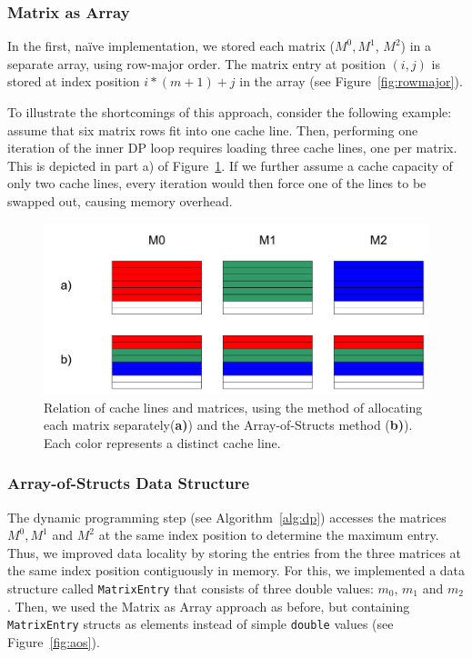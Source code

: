 \documentclass[runningheads,a4paper]{llncs}
\begin{document}
\subsubsection{Matrix as Array}
In the first, na\"ive implementation, we stored each matrix ($M^0, M^1$, $M^2$) in a separate array, using row-major order. 
The matrix entry at position $(i,j)$ is stored at index position $i*(m+1)+j$ in the array (see Figure~\ref{fig:rowmajor}).

To illustrate the shortcomings of this approach, consider the following example: assume that six matrix rows fit into one cache line. 
Then, performing one iteration of the inner DP loop requires loading three cache lines, one per matrix. 
This is depicted in part a) of Figure~\ref{fig:cachelines}.
If we further assume a cache capacity of only two cache lines, 
every iteration would then force one of the lines to be swapped out, causing memory overhead.

\begin{figure}
\centering
\includegraphics[width=\textwidth]{images/cachelines.pdf}
\caption{Relation of cache lines and matrices, using the method of allocating each matrix separately(\textbf{a)}) and the Array-of-Structs method (\textbf{b)}). 
Each color represents a distinct cache line.}
\label{fig:cachelines}
\end{figure}

\subsubsection{Array-of-Structs Data Structure}
The dynamic programming step (see Algorithm~\ref{alg:dp}) accesses the matrices $M^0, M^1$ and $M^2$ at the same index position to determine the maximum entry. 
Thus, we improved data locality by storing the entries from the three matrices at the same index position contiguously in memory. 
For this, we implemented a data structure called \texttt{MatrixEntry} that consists of three double values: \texttt{$m_0$}, \texttt{$m_1$} and \texttt{$m_2$}. 
Then, we used the Matrix as Array approach as before, but containing \texttt{MatrixEntry} structs as elements instead of simple 
\texttt{double} values (see Figure~\ref{fig:aos}). 
\end{document}
